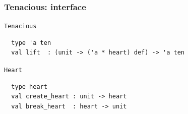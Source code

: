 \documentclass{beamer}
\begin{document}

% 
% 

% 
%




\begin{frame}[fragile]
\frametitle{Tenacious: interface}
{\tt Tenacious}
{\footnotesize
\begin{verbatim}
  type 'a ten
  val lift  : (unit -> ('a * heart) def) -> 'a ten
\end{verbatim}}

{\tt Heart}
{\footnotesize
\begin{verbatim}
  type heart
  val create_heart : unit -> heart
  val break_heart  : heart -> unit
\end{verbatim}}
\end{frame}
\end{document}
